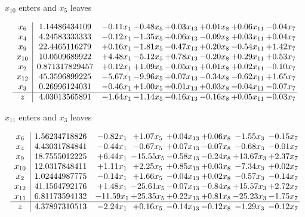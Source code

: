\documentclass[9pt]{article}
\begin{document}
 $ x_{10} $ enters and $ x_{5} $ leaves 

 \[\begin{array}{c| c c@{\hskip 2pt} c@{\hskip 2pt} c@{\hskip 2pt} c@{\hskip 2pt} c@{\hskip 2pt} c@{\hskip 2pt} }
 x_{6}   &  1.14486434109 & -0.11 x_{1} & -0.48 x_{5} & +  0.03 x_{13} & +  0.01 x_{8} & +  0.06 x_{11} & -0.04 x_{7}\\
 x_{4}   &  4.24583333333 & -0.12 x_{1} & -1.35 x_{5} & +  0.06 x_{13} & -0.09 x_{8} & +  0.03 x_{11} & +  0.04 x_{7}\\
 x_{9}   &  22.4465116279 & +  0.16 x_{1} & -1.81 x_{5} & -0.47 x_{13} & +  0.20 x_{8} & -0.54 x_{11} & +  1.42 x_{7}\\
 x_{10}   &  10.0509689922 & +  4.48 x_{1} & -5.12 x_{5} & +  0.78 x_{13} & -0.20 x_{8} & +  0.29 x_{11} & +  0.53 x_{7}\\
 x_{2}   &  0.871317829457 & +  0.12 x_{1} & +  1.09 x_{5} & -0.05 x_{13} & +  0.01 x_{8} & +  0.02 x_{11} & -0.10 x_{7}\\
 x_{12}   &  45.3596899225 & -5.67 x_{1} & -9.96 x_{5} & +  0.07 x_{13} & -0.34 x_{8} & -0.62 x_{11} & +  1.65 x_{7}\\
 x_{3}   &  0.26996124031 & -0.46 x_{1} & +  1.00 x_{5} & +  0.01 x_{13} & +  0.03 x_{8} & -0.04 x_{11} & -0.07 x_{7}\\
\hline
z    &  4.03013565891 & -1.64 x_{1} & -1.14 x_{5} & -0.16 x_{13} & -0.16 x_{8} & +  0.05 x_{11} & -0.03 x_{7}\\
\end{array}\]


 $ x_{11} $ enters and $ x_{3} $ leaves 

 \[\begin{array}{c| c c@{\hskip 2pt} c@{\hskip 2pt} c@{\hskip 2pt} c@{\hskip 2pt} c@{\hskip 2pt} c@{\hskip 2pt} }
 x_{6}   &  1.56234718826 & -0.82 x_{1} & +  1.07 x_{5} & +  0.04 x_{13} & +  0.06 x_{8} & -1.55 x_{3} & -0.15 x_{7}\\
 x_{4}   &  4.43031784841 & -0.44 x_{1} & -0.67 x_{5} & +  0.07 x_{13} & -0.07 x_{8} & -0.68 x_{3} & -0.01 x_{7}\\
 x_{9}   &  18.7555012225 & +  6.44 x_{1} & -15.55 x_{5} & -0.58 x_{13} & -0.24 x_{8} & + 13.67 x_{3} & +  2.37 x_{7}\\
 x_{10}   &  12.0317848411 & +  1.11 x_{1} & +  2.25 x_{5} & +  0.85 x_{13} & +  0.03 x_{8} & -7.34 x_{3} & +  0.02 x_{7}\\
 x_{2}   &  1.02444987775 & -0.14 x_{1} & +  1.66 x_{5} & -0.04 x_{13} & +  0.02 x_{8} & -0.57 x_{3} & -0.14 x_{7}\\
 x_{12}   &  41.1564792176 & +  1.48 x_{1} & -25.61 x_{5} & -0.07 x_{13} & -0.84 x_{8} & + 15.57 x_{3} & +  2.72 x_{7}\\
 x_{11}   &  6.81173594132 & -11.59 x_{1} & + 25.35 x_{5} & +  0.22 x_{13} & +  0.81 x_{8} & -25.23 x_{3} & -1.75 x_{7}\\
\hline
z    &  4.37897310513 & -2.24 x_{1} & +  0.16 x_{5} & -0.14 x_{13} & -0.12 x_{8} & -1.29 x_{3} & -0.12 x_{7}\\
\end{array}\]
\end{document}
